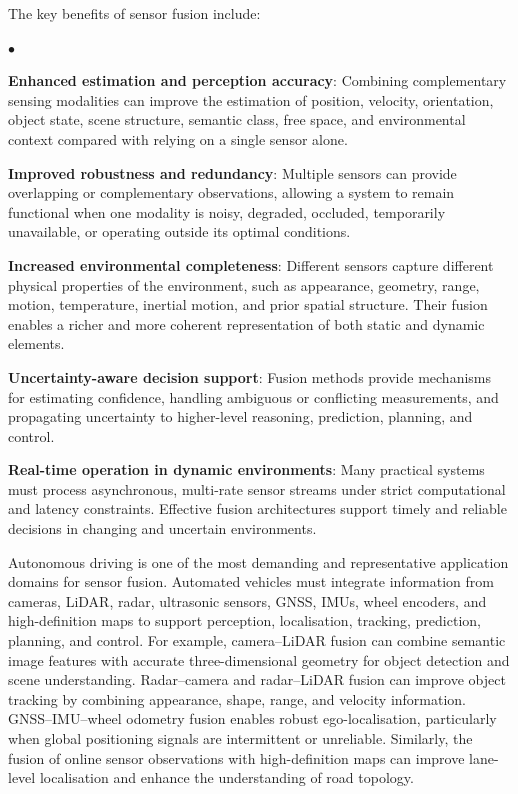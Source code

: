 \documentclass{ieeeaccess}
\newenvironment{list4a}{
  \begin{list}{$\bullet$}{%
      \setlength{\itemsep}{0.05cm}
      \setlength{\labelsep}{0.2cm}
      \setlength{\labelwidth}{0.3cm}
      \setlength{\parsep}{0in}
      \setlength{\parskip}{0in}
      \setlength{\topsep}{0in}
      \setlength{\partopsep}{0in}
      \setlength{\leftmargin}{0.16in}}}
      {\end{list}}
\begin{document}
The key benefits of sensor fusion include:
\begin{list4a}
    \item \textbf{Enhanced estimation and perception accuracy}: Combining complementary sensing modalities can improve the estimation of position, velocity, orientation, object state, scene structure, semantic class, free space, and environmental context compared with relying on a single sensor alone.
    \item \textbf{Improved robustness and redundancy}: Multiple sensors can provide overlapping or complementary observations, allowing a system to remain functional when one modality is noisy, degraded, occluded, temporarily unavailable, or operating outside its optimal conditions.
    \item \textbf{Increased environmental completeness}: Different sensors capture different physical properties of the environment, such as appearance, geometry, range, motion, temperature, inertial motion, and prior spatial structure. Their fusion enables a richer and more coherent representation of both static and dynamic elements.
    \item \textbf{Uncertainty-aware decision support}: Fusion methods provide mechanisms for estimating confidence, handling ambiguous or conflicting measurements, and propagating uncertainty to higher-level reasoning, prediction, planning, and control.
    \item \textbf{Real-time operation in dynamic environments}: Many practical systems must process asynchronous, multi-rate sensor streams under strict computational and latency constraints. Effective fusion architectures support timely and reliable decisions in changing and uncertain environments.
\end{list4a}

Autonomous driving is one of the most demanding and representative application domains for sensor fusion. Automated vehicles must integrate information from cameras, LiDAR, radar, ultrasonic sensors, GNSS, IMUs, wheel encoders, and high-definition maps to support perception, localisation, tracking, prediction, planning, and control. For example, camera--LiDAR fusion can combine semantic image features with accurate three-dimensional geometry for object detection and scene understanding. Radar--camera and radar--LiDAR fusion can improve object tracking by combining appearance, shape, range, and velocity information. GNSS--IMU--wheel odometry fusion enables robust ego-localisation, particularly when global positioning signals are intermittent or unreliable. Similarly, the fusion of online sensor observations with high-definition maps can improve lane-level localisation and enhance the understanding of road topology.
\end{document}

